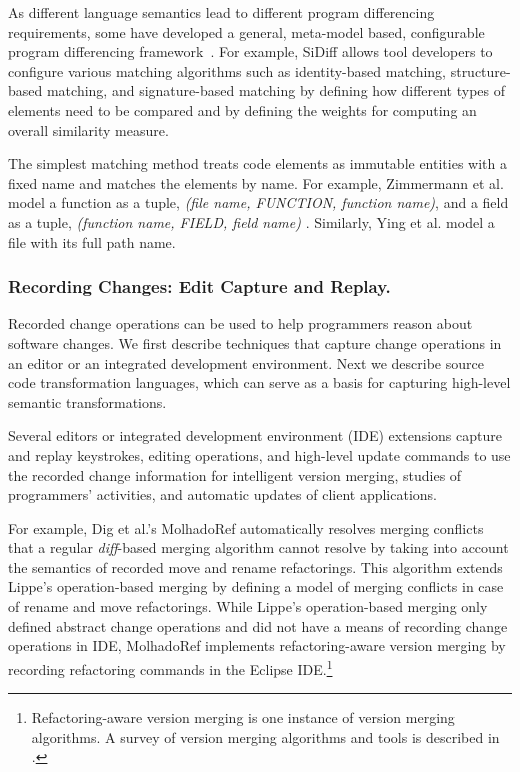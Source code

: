 \documentclass[runningheads,a4paper]{llncs}
\begin{document}
As different language semantics lead to different program differencing requirements, some have developed a general, meta-model based, configurable program differencing framework~\cite{Schmidt2008:sidiff, EMF}. For example, SiDiff \cite{Schmidt2008:sidiff,Treude2007} allows tool developers to configure various matching algorithms such as identity-based matching, structure-based matching, and signature-based matching by defining how different types of elements need to be compared and by defining the weights for computing an overall similarity measure.

The simplest matching method treats code elements as immutable entities with a fixed name and matches the elements by name. For example, Zimmermann et al. model a function as a tuple, \textit{(file name, FUNCTION, function name)}, and a field as a tuple, \textit{(function name, FIELD, field name)} \cite{Zimmermann2004}. Similarly, Ying et al. \cite{Ying2004} model a file with its full path name. %

\subsubsection{Recording Changes: Edit Capture and Replay.} 
Recorded change operations can be used to help programmers reason about software changes. We first describe techniques that capture change operations in an editor or an integrated development environment. Next we describe source code transformation languages, which can serve as a basis for capturing high-level semantic transformations. 

Several editors or integrated development environment (IDE) extensions capture and replay keystrokes, editing operations, and high-level update commands to use the recorded change information for intelligent version merging, studies of programmers' activities, and automatic updates of client applications. 

For example, Dig et al.'s MolhadoRef \cite{Dig2007} automatically resolves merging conflicts that a regular {\it diff}-based merging algorithm cannot resolve by taking into account the semantics of recorded move and rename refactorings. This algorithm extends Lippe's operation-based merging \cite{Lippe1992} by defining a model of merging conflicts in case of rename and move refactorings. While Lippe's operation-based merging only defined abstract change operations and did not have a means of recording change operations in IDE, MolhadoRef implements refactoring-aware version merging by recording refactoring commands in the Eclipse IDE.\footnote{Refactoring-aware version merging is one instance of version merging algorithms. A survey of version merging algorithms and tools is described in \cite{mens:survey02}.}
\end{document}
